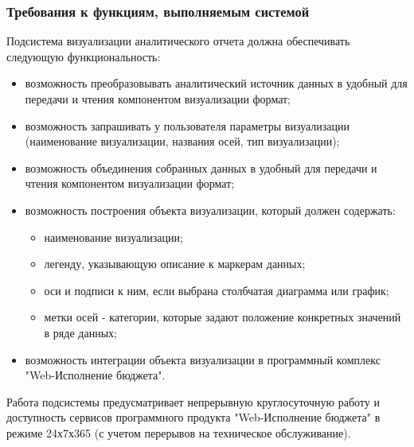 \documentclass[a4paper]{extarticle}
\numberwithin{equation}{section}
\begin{document}
\subsubsection{Требования к функциям, выполняемым системой}
Подсистема визуализации аналитического отчета должна обеспечивать следующую функциональность:\par
\begin{itemize}
  \item возможность преобразовывать аналитический источник данных в удобный для передачи и чтения компонентом визуализации формат;
  \item возможность запрашивать у пользователя параметры визуализации (наименование визуализации, названия осей, тип визуализации);
  \item возможность объединения собранных данных в удобный для передачи и чтения компонентом визуализации формат;
  \item возможность построения объекта визуализации, который должен содержать:
    \begin{itemize}
    	\item наименование визуализации;
        \item легенду, указывающую описание к маркерам данных;
    	\item оси и подписи к ним, если выбрана столбчатая диаграмма или график;
        \item метки осей - категории, которые задают положение конкретных значений в ряде данных;
    \end{itemize}
  \item возможность интеграции объекта визуализации в программный комплекс "Web-Исполнение бюджета".
\end{itemize}\par
Работа подсистемы предусматривает непрерывную круглосуточную работу и доступность сервисов программного продукта "Web-Исполнение бюджета" в режиме 24х7х365 (с учетом перерывов на техническое обслуживание).
\end{document}
